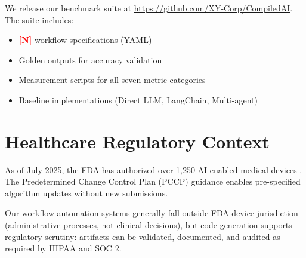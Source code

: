 \documentclass[11pt]{article}
\newcommand{\placeholder}[1]{\textcolor{red}{\textbf{[#1]}}}
\begin{document}
We release our benchmark suite at \url{https://github.com/XY-Corp/CompiledAI}. The suite includes:

\begin{itemize}
    \item \placeholder{N} workflow specifications (YAML)
    \item Golden outputs for accuracy validation
    \item Measurement scripts for all seven metric categories
    \item Baseline implementations (Direct LLM, LangChain, Multi-agent)
\end{itemize}

\section{Healthcare Regulatory Context}
\label{app:regulatory}

As of July 2025, the FDA has authorized over 1,250 AI-enabled medical devices \citep{fda2025}. The Predetermined Change Control Plan (PCCP) guidance enables pre-specified algorithm updates without new submissions.

Our workflow automation systems generally fall outside FDA device jurisdiction (administrative processes, not clinical decisions), but code generation supports regulatory scrutiny: artifacts can be validated, documented, and audited as required by HIPAA and SOC 2.
\end{document}

